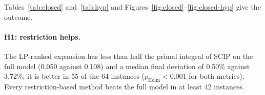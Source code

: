\begin{table}[t]\centering\small
\caption{Pre-registered hypotheses on the pooled synthetic set (64 instances). $\bar\Delta$: mean
of the per-instance difference A~$-$~B, with 95\% bootstrap interval; negative values favor A.
The deviation is in percentage points. \emph{A/B}: number of instances in which A or B is
better. $p$: paired Wilcoxon signed-rank test; $p_{\mathrm{Holm}}$: after Holm's correction over
the four hypotheses of the same metric.}\label{tab:hyp}
\end{table}

Tables~\ref{tab:closed} and~\ref{tab:hyp} and Figures~\ref{fig:closed}--\ref{fig:closed-hyp}
give the outcome.

\paragraph{H1: restriction helps.} The LP-ranked expansion has less than half the primal integral
of SCIP on the full model (0.050 against 0.108) and a median final deviation of 0.50\% against
3.72\%; it is better in 55 of the 64 instances ($p_{\mathrm{Holm}}<0.001$ for both metrics).
Every restriction-based method beats the full model in at least 42 instances.

